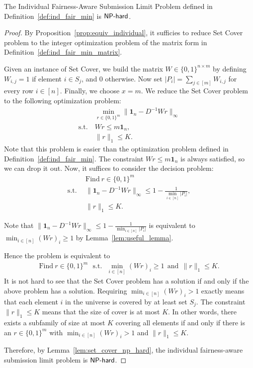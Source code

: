\begin{theorem}\label{thm:indi_nphard_append}
    The Individual Fairness-Aware Submission Limit Problem defined in Definition~\ref{def:ind_fair_min} is $\mathsf{NP}\text{-}\mathsf{hard}$.
\end{theorem}
\begin{proof}
    By Proposition~\ref{prop:equiv_individual}, it sufficies to reduce Set Cover problem to the integer optimization problem of the matrix form in Definition~\ref{def:ind_fair_min_matrix}.

    Given an instance of Set Cover, we build the matrix $W \in \{0, 1\}^{n\times m}$ by defining $W_{i,j} = 1$ if element $i \in S_j$, and 0 otherwise.
    Now set $|P_i| = \sum_{j \in [m]} W_{i,j}$ for every row $i \in [n]$. Finally, we choose $x = m$. We reduce the Set Cover problem to the following optimization problem:
    \begin{align*}
        & ~ \min_{r \in \{0,1\}^m} \| \mathbf{1}_n - D^{-1}Wr\|_\infty \\
    \mathrm{s.t.}
    & ~ W r \leq m \mathbf{1}_n, \\
    & ~ \|r\|_1 \leq K.
    \end{align*}
    Note that this problem is easier than the optimization problem defined in Definition~\ref{def:ind_fair_min}. The constraint $ W r \leq m \mathbf{1}_n$ is always satisfied, so we can drop it out. Now, it suffices to consider the decision problem:
    \begin{align*}
        &~ \mathrm{Find~} r \in \{0,1\}^m \\ \mathrm{s.t.~} &~
       \|\mathbf{1}_n - D^{-1}Wr\|_\infty \leq 1 - \frac{1}{\min_{i \in [n]}|P_i|}, \\
       &~ \|r\|_1 \leq K.
    \end{align*}

    Note that $\|\mathbf{1}_n - D^{-1}Wr\|_\infty \leq 1 - \frac{1}{\min_{i \in [n]}|P_i|}$ is equivalent to 
       $\min_{i\in[n]} (Wr)_i \geq 1$ by Lemma~\ref{lem:useful_lemma}.

    Hence the problem is equivalent to
    \begin{align*}
       \mathrm{Find~} r \in \{0,1\}^m  \mathrm{~~~s.t.~~~}
       \min_{i\in[n]} (Wr)_i \geq 1 \mathrm{~~and~~} 
        \|r\|_1 \leq K.
    \end{align*}
    It is not hard to see that the Set Cover problem has a solution if and only if the above problem has a solution.
    Requiring $\min_{i \in [n]} (W r)_i > 1$ exactly means that each element $i$ in the universe is covered by at least set $S_j$. The constraint $\|r\|_1 \leq K$ means that the size of cover is at most $K$. In other words, there exists a subfamily of size at most $K$ covering all elements if and only if there is an $r \in \{0,1\}^m$ with $\min_{i \in [n]} (W r)_i > 1$ and $\|r\|_1 \leq K$.
    
    Therefore, by Lemma~\ref{lem:set_cover_np_hard}, the individual fairness-aware submission limit problem is $\mathsf{NP}\text{-}\mathsf{hard}$.
\end{proof}

